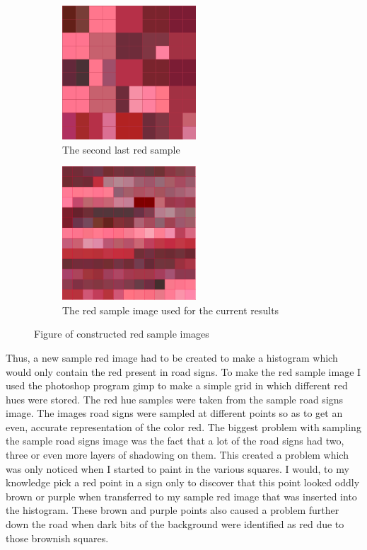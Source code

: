\documentclass{article}
\begin{document}
\begin{figure}[H]
\begin{subfigure}{0.5\textwidth}
\includegraphics[width=0.9\linewidth, height=5cm]{ROADSIGN_samplered.png} 
\caption{The second last red sample}
\label{fig:subim1}
\end{subfigure}
\begin{subfigure}{0.5\textwidth}
\includegraphics[width=0.9\linewidth, height=5cm]{ROADSIGN_samplered2.png}
\caption{The red sample image used for the current results}
\label{fig:subim2}
\end{subfigure}
\caption{Figure of constructed red sample images}
\label{fig:image2}
\end{figure}
Thus, a new sample red image had to be created to make a histogram which would only contain the red present in road signs. To make the red sample image I used the photoshop program gimp to make a simple grid in which different red hues were stored. The red hue samples were taken from the sample road signs image. The images road signs were sampled at different points so as to get an even, accurate representation of the color red.
The biggest problem with sampling the sample road signs image was the fact that a lot of the road signs had two, three or even more layers of shadowing on them. This created a problem which was only noticed when I started to paint in the various squares. I would, to my knowledge pick a red point in a sign only to discover that this point looked oddly brown or purple when transferred to my sample red image that was inserted into the histogram. These brown and purple points also caused a problem further down the road when dark bits of the background were identified as red due to those brownish squares.\\
\end{document}
